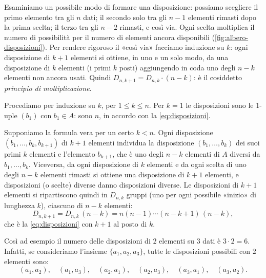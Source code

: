 \begin{strategia}
Esaminiamo un possibile modo di formare una disposizione: possiamo scegliere il primo
elemento tra gli $n$ dati; il secondo solo tra gli $n-1$ elementi rimasti dopo la prima
scelta; il terzo tra gli $n-2$ rimasti, e così via. Ogni scelta moltiplica il numero di
possibilità per il numero di elementi ancora disponibili (\cref{fig:albero-disposizioni}).
Per rendere rigoroso il «così via» facciamo induzione su $k$: ogni disposizione di $k+1$
elementi si ottiene, in uno e un solo modo, da una disposizione di $k$ elementi (i primi
$k$ posti) aggiungendo in coda uno degli $n-k$ elementi non ancora usati. Quindi
$D_{n,k+1}=D_{n,k}\cdot(n-k)$: è il cosiddetto \emph{principio di moltiplicazione}.
\end{strategia}

\begin{dimostrazione}
Procediamo per induzione su $k$, per $1\le k\le n$. Per $k=1$ le disposizioni sono le
$1$-uple $(b_{1})$ con $b_{1}\in A$: sono $n$, in accordo con la \eqref{eq:disposizioni}.

Supponiamo la formula vera per un certo $k<n$. Ogni disposizione
$(b_{1},\dots,b_{k},b_{k+1})$ di $k+1$ elementi individua la disposizione
$(b_{1},\dots,b_{k})$ dei suoi primi $k$ elementi e l'elemento $b_{k+1}$, che è uno degli
$n-k$ elementi di $A$ diversi da $b_{1},\dots,b_{k}$. Viceversa, da ogni disposizione di
$k$ elementi e da ogni scelta di uno degli $n-k$ elementi rimasti si ottiene una
disposizione di $k+1$ elementi, e disposizioni (o scelte) diverse danno disposizioni
diverse. Le disposizioni di $k+1$ elementi si ripartiscono quindi in $D_{n,k}$ gruppi
(uno per ogni possibile «inizio» di lunghezza $k$), ciascuno di $n-k$ elementi:
\[
  D_{n,k+1}=D_{n,k}\,(n-k)=n(n-1)\cdots(n-k+1)\,(n-k),
\]
che è la \eqref{eq:disposizioni} con $k+1$ al posto di $k$.
\end{dimostrazione}

Così ad esempio il numero delle disposizioni di $2$ elementi su $3$ dati è
$3\cdot2=6$. Infatti, se consideriamo l'insieme $\{a_{1},a_{2},a_{3}\}$, tutte le
disposizioni possibili con $2$ elementi sono:
\begin{equation}\label{eq:disposizioni-esempio}
  (a_{1},a_{2}),\quad (a_{1},a_{3}),\quad (a_{2},a_{1}),\quad (a_{2},a_{3}),\quad
  (a_{3},a_{1}),\quad (a_{3},a_{2}).
\end{equation}

